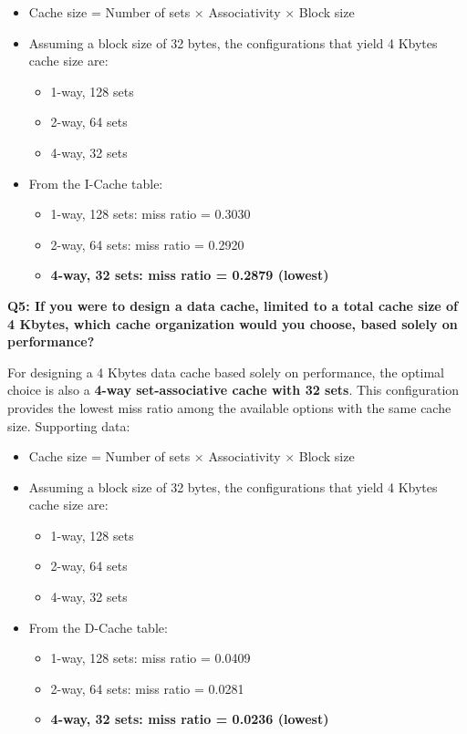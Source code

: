 \documentclass{article}
\begin{document}
\begin{itemize}
	\item Cache size = Number of sets $\times$ Associativity $\times$ Block size
	\item Assuming a block size of 32 bytes, the configurations that yield 4 Kbytes cache size are:
	\begin{itemize}
		\item 1-way, 128 sets
		\item 2-way, 64 sets
		\item 4-way, 32 sets
	\end{itemize}
	\item From the I-Cache table:
	\begin{itemize}
		\item 1-way, 128 sets: miss ratio = 0.3030
		\item 2-way, 64 sets: miss ratio = 0.2920
		\item \textbf{4-way, 32 sets: miss ratio = 0.2879 (lowest)}
	\end{itemize}
\end{itemize}

\textbf{Q5: If you were to design a data cache, limited to a total cache size of 4 Kbytes, which cache organization would you choose, based solely on performance?}

For designing a 4 Kbytes data cache based solely on performance, the optimal choice is also a \textbf{4-way set-associative cache with 32 sets}. This configuration provides the lowest miss ratio among the available options with the same cache size. Supporting data:

\begin{itemize}
	\item Cache size = Number of sets $\times$ Associativity $\times$ Block size
	\item Assuming a block size of 32 bytes, the configurations that yield 4 Kbytes cache size are:
	\begin{itemize}
		\item 1-way, 128 sets
		\item 2-way, 64 sets
		\item 4-way, 32 sets
	\end{itemize}
	\item From the D-Cache table:
	\begin{itemize}
		\item 1-way, 128 sets: miss ratio = 0.0409
		\item 2-way, 64 sets: miss ratio = 0.0281
		\item \textbf{4-way, 32 sets: miss ratio = 0.0236 (lowest)}
	\end{itemize}
\end{itemize}

	
\end{document}
